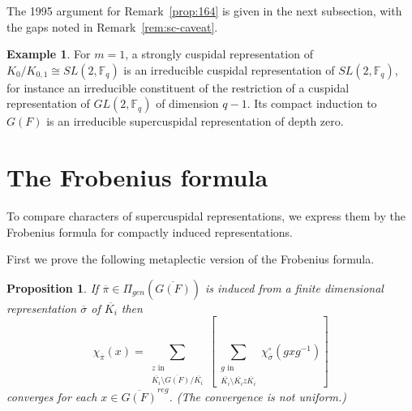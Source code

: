 \documentclass[12pt,letterpaper]{book}
\theoremstyle{plain}
\newtheorem{proposition}[theorem]{Proposition}
\theoremstyle{definition}
\newtheorem{example}[theorem]{Example}
\theoremstyle{remark}
\theoremstyle{remark}
\begin{document}
The 1995 argument for Remark~\ref{prop:164} is given in the next subsection,
with the gaps noted in Remark~\ref{rem:sc-caveat}.

\begin{example}
For $m=1$, a strongly cuspidal representation of $K_0/K_{0,1}\cong
SL(2,{\mathbb F}_q)$ is an irreducible cuspidal representation of
$SL(2,{\mathbb F}_q)$, for instance an irreducible constituent of the
restriction of a cuspidal representation of $GL(2,{\mathbb F}_q)$ of
dimension $q-1$. Its compact induction to $G(F)$ is an irreducible
supercuspidal representation of depth zero.
\end{example}

\section{The Frobenius formula}

To compare characters of supercuspidal representations, we express them by the Frobenius formula for compactly induced representations.


First we prove the following metaplectic version of the Frobenius formula.

\begin{proposition} If $\overline{\pi} \in \Pi_{gen}(\overline{G(F)})$
is induced from a finite dimensional representation $\overline{\sigma}$
of $\overline{K_i}$ then
$$
\chi_{\overline{\pi}} (x)=\sum_{\substack{ z \text{ in }\\
\overline{K_i}\setminus\overline{G(F)}/\overline{K_i}}}
[\sum_{\substack{ g \text{ in }\\
\overline{K_i}\setminus\overline{K_i}z\overline{K_i}}}
\chi_{\overline{\sigma}}^\circ (gxg^{-1})]
$$
converges for each $x\in \overline{G(F)}^{reg}$. (The convergence is not
uniform.)
\label{prop:166}
\end{proposition}
\end{document}
